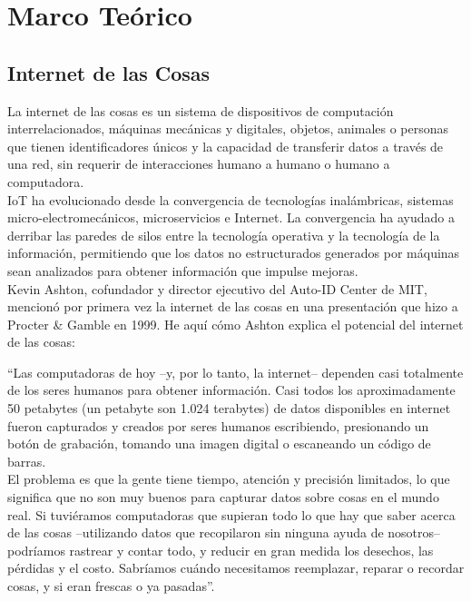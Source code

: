 \chapter{Marco Teórico}

\section{Internet de las Cosas}

La internet de las cosas es un sistema de dispositivos de computación interrelacionados, máquinas mecánicas y digitales, objetos, animales o personas que tienen identificadores únicos y la capacidad de transferir datos a través de una red, sin requerir de interacciones humano a humano o humano a computadora. \\

IoT ha evolucionado desde la convergencia de tecnologías inalámbricas, sistemas micro-electromecánicos, microservicios e Internet. La convergencia ha ayudado a derribar las paredes de silos entre la tecnología operativa y la tecnología de la información, permitiendo que los datos no estructurados generados por máquinas sean analizados para obtener información que impulse mejoras. \cite{TechT2017}\\

Kevin Ashton, cofundador y director ejecutivo del Auto-ID Center de MIT, mencionó por primera vez la internet de las cosas en una presentación que hizo a Procter \& Gamble en 1999. He aquí cómo Ashton explica el potencial del internet de las cosas:

``Las computadoras de hoy –y, por lo tanto, la internet– dependen casi totalmente de los seres humanos para obtener información. Casi todos los aproximadamente 50 petabytes (un petabyte son 1.024 terabytes) de datos disponibles en internet fueron capturados y creados por seres humanos escribiendo, presionando un botón de grabación, tomando una imagen digital o escaneando un código de barras. \\

El problema es que la gente tiene tiempo, atención y precisión limitados, lo que significa que no son muy buenos para capturar datos sobre cosas en el mundo real. Si tuviéramos computadoras que supieran todo lo que hay que saber acerca de las cosas –utilizando datos que recopilaron sin ninguna ayuda de nosotros– podríamos rastrear y contar todo, y reducir en gran medida los desechos, las pérdidas y el costo. Sabríamos cuándo necesitamos reemplazar, reparar o recordar cosas, y si eran frescas o ya pasadas”. \cite{Asthon2009}

